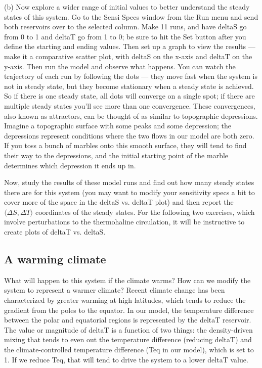 \documentclass[11pt,letterpaper]{article}
\begin{document}
(b) Now explore a wider range of initial values to better understand the steady states of this system. Go to the Sensi Specs window from the Run menu and send both reservoirs over to the selected column. Make 11 runs, and have deltaS go from 0 to 1 and deltaT go from 1 to 0; be sure to hit the Set button after you define the starting and ending values. Then set up a graph to view the results --- make it a comparative scatter plot, with deltaS on the x-axis and deltaT on the y-axis. Then run the model and observe what happens. You can watch the trajectory of each run by following the dots --- they move fast when the system is not in steady state, but they become stationary when a steady state is achieved. So if there is one steady state, all dots will converge on a single spot; if there are multiple steady states you’ll see more than one convergence. These convergences, also known as attractors, can be thought of as similar to topographic depressions. Imagine a topographic surface with some peaks and some depression; the depressions represent conditions where the two flows in our model are both zero. If you toss a bunch of marbles onto this smooth surface, they will tend to find their way to the depressions, and the initial starting point of the marble determines which depression it ends up in.

Now, study the results of these model runs and find out how many steady states there are for this system (you may want to modify your sensitivity specs a bit to cover more of the space in the deltaS vs. deltaT plot) and then report the $\langle\Delta S, \Delta T\rangle$ coordinates of the steady states. For the following two exercises, which involve perturbations to the thermohaline circulation, it will be instructive to create plots of deltaT vs. deltaS.

\subsection{A warming climate}
What will happen to this system if the climate warms? How can we modify the system to represent a warmer climate? Recent climate change has been characterized by greater warming at high latitudes, which tends to reduce the gradient from the poles to the equator. In our model, the temperature difference between the polar and equatorial regions is represented by the deltaT reservoir. The value or magnitude of deltaT is a function of two things: the density-driven mixing that tends to even out the temperature difference (reducing deltaT) and the climate-controlled temperature difference (Teq in our model), which is set to 1. If we reduce Teq, that will tend to drive the system to a lower deltaT value.
\end{document}
